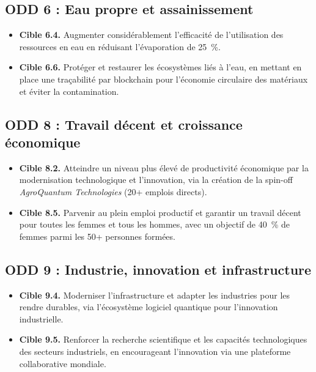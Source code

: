 \documentclass[12pt, a4paper]{article}
\begin{document}
\subsection{ODD 6 : Eau propre et assainissement}
\begin{itemize}
    \item \textbf{Cible 6.4.} Augmenter considérablement l'efficacité de l'utilisation des ressources en eau en réduisant l'évaporation de \SI{25}{\percent}.

    \item \textbf{Cible 6.6.} Protéger et restaurer les écosystèmes liés à l'eau, en mettant en place une traçabilité par blockchain pour l'économie circulaire des matériaux et éviter la contamination.
\end{itemize}

\subsection{ODD 8 : Travail décent et croissance économique}
\begin{itemize}
    \item \textbf{Cible 8.2.} Atteindre un niveau plus élevé de productivité économique par la modernisation technologique et l'innovation, via la création de la spin-off \textit{AgroQuantum Technologies} (\num{20}+ emplois directs).

    \item \textbf{Cible 8.5.} Parvenir au plein emploi productif et garantir un travail décent pour toutes les femmes et tous les hommes, avec un objectif de \SI{40}{\percent} de femmes parmi les \num{50}+ personnes formées.
\end{itemize}

\subsection{ODD 9 : Industrie, innovation et infrastructure}
\begin{itemize}
    \item \textbf{Cible 9.4.} Moderniser l'infrastructure et adapter les industries pour les rendre durables, via l'écosystème logiciel quantique pour l'innovation industrielle.

    \item \textbf{Cible 9.5.} Renforcer la recherche scientifique et les capacités technologiques des secteurs industriels, en encourageant l'innovation via une plateforme collaborative mondiale.
\end{itemize}
\end{document}
